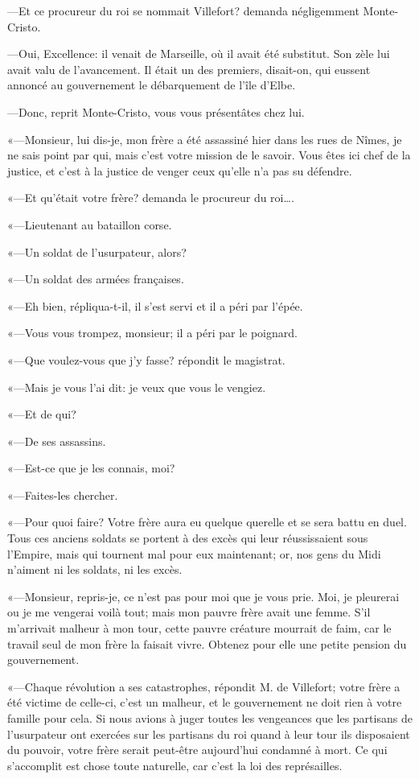 —Et ce procureur du roi se nommait Villefort? demanda négligemment Monte-Cristo. 

—Oui, Excellence: il venait de Marseille, où il avait été substitut. Son zèle lui avait valu de l'avancement. Il était un des premiers, disait-on, qui eussent annoncé au gouvernement le débarquement de l'île d'Elbe. 

—Donc, reprit Monte-Cristo, vous vous présentâtes chez lui. 

«—Monsieur, lui dis-je, mon frère a été assassiné hier dans les rues de Nîmes, je ne sais point par qui, mais c'est votre mission de le savoir. Vous êtes ici chef de la justice, et c'est à la justice de venger ceux qu'elle n'a pas su défendre. 

«—Et qu'était votre frère? demanda le procureur du roi\dots. 

«—Lieutenant au bataillon corse. 

«—Un soldat de l'usurpateur, alors? 

«—Un soldat des armées françaises. 

«—Eh bien, répliqua-t-il, il s'est servi et il a péri par l'épée. 

«—Vous vous trompez, monsieur; il a péri par le poignard. 

«—Que voulez-vous que j'y fasse? répondit le magistrat. 

«—Mais je vous l'ai dit: je veux que vous le vengiez. 

«—Et de qui? 

«—De ses assassins. 

«—Est-ce que je les connais, moi? 

«—Faites-les chercher.  

«—Pour quoi faire? Votre frère aura eu quelque querelle et se sera battu en duel. Tous ces anciens soldats se portent à des excès qui leur réussissaient sous l'Empire, mais qui tournent mal pour eux maintenant; or, nos gens du Midi n'aiment ni les soldats, ni les excès. 

«—Monsieur, repris-je, ce n'est pas pour moi que je vous prie. Moi, je pleurerai ou je me vengerai voilà tout; mais mon pauvre frère avait une femme. S'il m'arrivait malheur à mon tour, cette pauvre créature mourrait de faim, car le travail seul de mon frère la faisait vivre. Obtenez pour elle une petite pension du gouvernement. 

«—Chaque révolution a ses catastrophes, répondit M. de Villefort; votre frère a été victime de celle-ci, c'est un malheur, et le gouvernement ne doit rien à votre famille pour cela. Si nous avions à juger toutes les vengeances que les partisans de l'usurpateur ont exercées sur les partisans du roi quand à leur tour ils disposaient du pouvoir, votre frère serait peut-être aujourd'hui condamné à mort. Ce qui s'accomplit est chose toute naturelle, car c'est la loi des représailles. 

